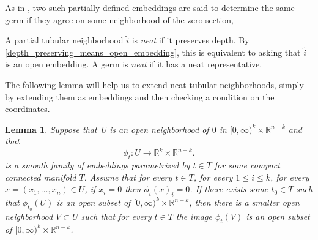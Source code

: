 \documentclass[11pt]{amsart}
\newtheorem{lem}{Lemma}[section]
\theoremstyle{definition}
\numberwithin{equation}{section}
\numberwithin{figure}{section}
\newcommand{\R}{\mathbb R}
\newcommand{\ourdefn}[1]{{\it #1}}
\begin{document}
As in \cite[Def 2.25]{GIMM1}, two such partially defined embeddings are said to determine the same germ if they agree on some neighborhood of the zero section, 

A partial tubular neighborhood $\tilde i$ is \ourdefn{neat} if it preserves depth. By \autoref{depth_preserving_means_open_embedding}, this is equivalent to asking that $\tilde i$ is an open embedding. A germ is \ourdefn{neat} if it has a neat representative. 


The following lemma will help us to extend neat tubular neighborhoods, simply by extending them as embeddings and then checking a condition on the coordinates.

\begin{lem}\label{neat_isotopy}
	Suppose that U is an open neighborhood of $0$ in $[0,\infty)^k \times \R^{n-k}$ and that 
	\[ \phi_t\colon U  \to \R^k\times \R^{n-k}. \]
is a smooth family of embeddings parametrized by $t\in T$ for some compact connected manifold $T$. Assume that for every $t\in T$, for every $1 \leq i \leq k$, for every $x = (x_1,\ldots,x_n)\in U$, if $x_i=0$ then $\phi_t(x)_i=0$. If there exists some $t_0\in T$ such that $\phi_{t_0}(U)$ is an open subset of $[0,\infty)^k \times \R^{n-k}$, then there is a smaller open neighborhood $V\subset U$ such that for every $t\in T$ the image $\phi_{t}(V)$ is an open subset of $[0,\infty)^k \times \R^{n-k}$. 

	
\end{lem}
\end{document}
